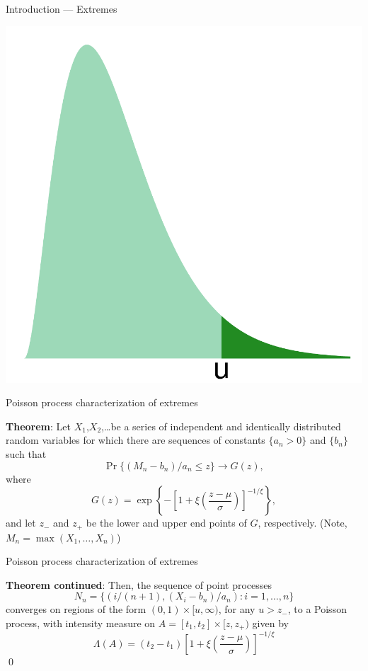 \documentclass[mathserif, 11pt, t]{beamer}
\begin{document}
\begin{frame}{Introduction --- Extremes}
\begin{center}
\includegraphics[scale=0.35]{../figs/tail.pdf}
\end{center}
\end{frame}

\begin{frame}{Poisson process characterization of extremes}

\textbf{Theorem}: Let $X_1$,$X_2$,\ldots be a series of independent and identically distributed random variables for which there are sequences of constants $\{a_n>0\}$ and $\{b_n\}$ such that
\[ \Pr\{(M_n - b_n)/a_n \leq z \} \rightarrow G(z), \]
where
\[ G(z) = \exp\left\{-\left[1+\xi\left(\frac{z-\mu}{\sigma}\right)\right]^{-1/\xi}\right\}, \]
and let $z_{-}$ and $z_{+}$ be the lower and upper end points of $G$, respectively. (Note, $M_n = \max(X_1,\ldots, X_n)$)
\end{frame}

\begin{frame}{Poisson process characterization of extremes}

\textbf{Theorem continued}: Then, the sequence of point processes
\[N_n = \{(i/(n+1),(X_i-b_n)/a_n):i=1,\ldots,n\} \]
converges on regions of the form $(0,1)\times[u,\infty)$, for any $u>z_{-}$, to a Poisson process, with intensity measure on $A=[t_1,t_2]\times[z,z_{+})$ given by
\[ \Lambda(A)=(t_2-t_1)\left[1+\xi\left(\frac{z-\mu}{\sigma}\right)\right]^{-1/\xi} \]
\qed
\end{frame}
\end{document}
